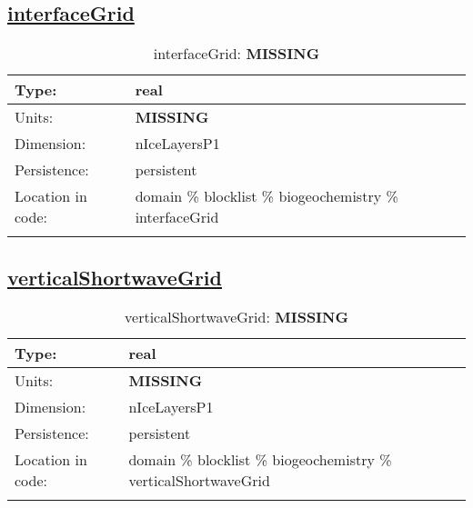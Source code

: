 \subsection[interfaceGrid]{\hyperref[sec:var_tab_biogeochemistry]{interfaceGrid}}
\label{subsec:var_sec_biogeochemistry_interfaceGrid}
\begin{center}
\begin{longtable}{| p{2.0in} | p{4.0in} |}
        \hline 
        Type: & real \\
        \hline 
        Units: & {\bf \color{red} MISSING} \\
        \hline 
        Dimension: & nIceLayersP1 \\
        \hline 
        Persistence: & persistent \\
        \hline 
         Location in code: & domain \% blocklist \% biogeochemistry \% interfaceGrid \\
         \hline 
    \caption{interfaceGrid: {\bf \color{red} MISSING}}
\end{longtable}
\end{center}
\subsection[verticalShortwaveGrid]{\hyperref[sec:var_tab_biogeochemistry]{verticalShortwaveGrid}}
\label{subsec:var_sec_biogeochemistry_verticalShortwaveGrid}
\begin{center}
\begin{longtable}{| p{2.0in} | p{4.0in} |}
        \hline 
        Type: & real \\
        \hline 
        Units: & {\bf \color{red} MISSING} \\
        \hline 
        Dimension: & nIceLayersP1 \\
        \hline 
        Persistence: & persistent \\
        \hline 
         Location in code: & domain \% blocklist \% biogeochemistry \% verticalShortwaveGrid \\
         \hline 
    \caption{verticalShortwaveGrid: {\bf \color{red} MISSING}}
\end{longtable}
\end{center}
